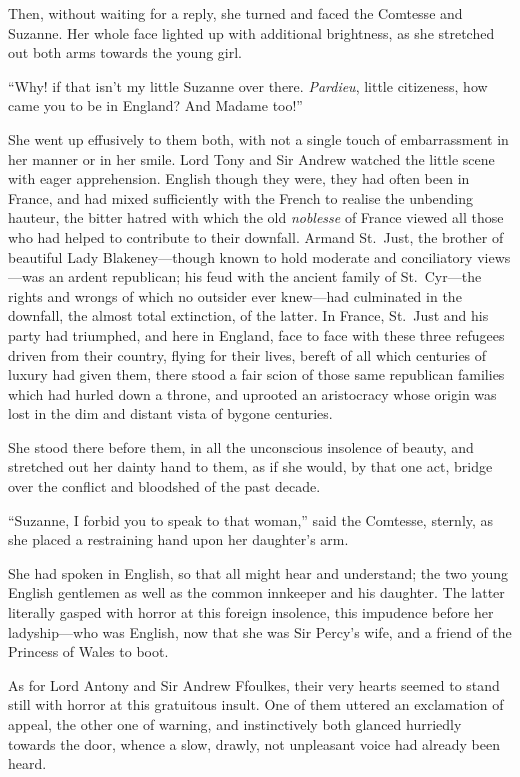 \documentclass[paper=5.5in:8.5in,BCOR=7mm,twoside,DIV=calc,12pt,usegeometry,chapterprefix,endperiod,headings=big]{scrbook}
\begin{document}
Then, without waiting for a reply, she turned and faced the Comtesse and Suzanne. Her whole face lighted up with additional brightness, as she stretched out both arms towards the young girl.

\enquote{Why! if that isn't my little Suzanne over there. \textit{Pardieu}, little citizeness, how came you to be in England? And Madame too!}

She went up effusively to them both, with not a single touch of embarrassment in her manner or in her smile. Lord Tony and Sir Andrew watched the little scene with eager apprehension. English though they were, they had often been in France, and had mixed sufficiently with the French to realise the unbending hauteur, the bitter hatred with which the old \textit{noblesse} of France viewed all those who had helped to contribute to their downfall. Armand St.~Just, the brother of beautiful Lady Blakeney---though known to hold moderate and conciliatory views---was an ardent republican; his feud with the ancient family of St.~Cyr---the rights and wrongs of which no outsider ever knew---had culminated in the downfall, the almost total extinction, of the latter. In France, St.~Just and his party had triumphed, and here in England, face to face with these three refugees driven from their country, flying for their lives, bereft of all which centuries of luxury had given them, there stood a fair scion of those same republican families which had hurled down a throne, and uprooted an aristocracy whose origin was lost in the dim and distant vista of bygone centuries.

She stood there before them, in all the unconscious insolence of beauty, and stretched out her dainty hand to them, as if she would, by that one act, bridge over the conflict and bloodshed of the past decade.

\enquote{Suzanne, I forbid you to speak to that woman,} said the Comtesse, sternly, as she placed a restraining hand upon her daughter's arm.

She had spoken in English, so that all might hear and understand; the two young English gentlemen as well as the common innkeeper and his daughter. The latter literally gasped with horror at this foreign insolence, this impudence before her ladyship---who was English, now that she was Sir Percy's wife, and a friend of the Princess of Wales to boot.

As for Lord Antony and Sir Andrew Ffoulkes, their very hearts seemed to stand still with horror at this gratuitous insult. One of them uttered an exclamation of appeal, the other one of warning, and instinctively both glanced hurriedly towards the door, whence a slow, drawly, not unpleasant voice had already been heard.
\end{document}
